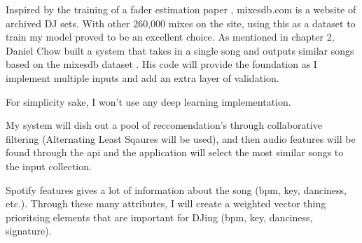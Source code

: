 Inspired by the training of a fader estimation paper \citep{kim_automatic_2017}, mixesdb.com is a website of archived DJ sets. With other 260,000 mixes on the site, using this as a dataset to train my model proved to be an excellent choice. As mentioned in chapter 2, Daniel Chow built a system that takes in a single song and outputs similar songs based on the mixesdb dataset \citep{chow_music_2020}. His code will provide the foundation as I implement multiple inputs and add an extra layer of validation.

For simplicity sake, I won't use any deep learning implementation.

My system will dish out a pool of reccomendation's through collaborative filtering (Alternating Least Sqaures will be used), and then audio features will be found through the api and the application will select the most similar songs to the input collection. 

Spotify features gives a lot of information about the song (bpm, key, danciness, etc.). Through these many attributes, I will create a weighted vector thing prioritsing elements tbat are important for DJing (bpm, key, danciness, signature).



